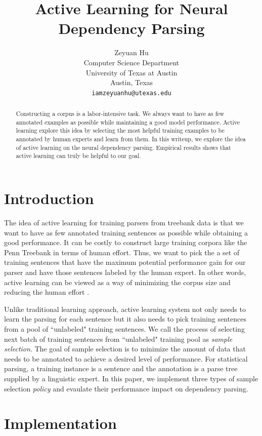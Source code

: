\documentclass[11pt,letterpaper]{article}
\title{Active Learning for Neural Dependency Parsing}
\author{Zeyuan Hu \\
  Computer Science Department \\
  University of Texas at Austin \\
  Austin, Texas \\
  {\tt iamzeyuanhu@utexas.edu} \\
}
\date{}
\begin{document}
\maketitle

\begin{abstract}
	Constructing a corpus is a labor-intensive task. We always want to have as few annotated
	examples as possible while maintaining a good model performance. Active learning explore
	this idea by selecting the most helpful training examples to be annotated by human experts and
	learn from them. In this writeup, we explore the idea of active learning on the neural dependency
	parsing. Empirical results shows that active learning can truly be helpful to our goal.
\end{abstract}

\section{Introduction}

The idea of active learning for training parsers from treebank data is that we want 
to have as few annotated training sentences as possible while obtaining a good performance.
It can be costly to construct large training corpora like the Penn Treebank \cite{Marcus:1994} in terms of
human effort. Thus, we want to pick the a set of training sentences that have the maximum potential performance gain 
for our parser and have those sentences labeled by the human expert. In other words,
active learning can be viewed as a way of minimizing the corpus size and reducing the human effort \cite{Hwa:2000:SSS:1117794.1117800}.

Unlike traditional learning approach, active learning system not only needs to learn the parsing for each sentence but
it also needs to pick training sentences from a pool of ``unlabeled" training sentences. We call the process of
selecting next batch of training sentences from ``unlabeled" training pool as \emph{sample selection}. The goal of
sample selection is to minimize the amount of data that needs to be annotated to achieve a desired level of performance. 
For statistical parsing, a training instance is a sentence and the annotation is a parse tree supplied by a linguistic expert. 
In this paper, we implement three types of sample selection \emph{policy} and evaulate their performance impact on dependency parsing.

\section{Implementation}
\end{document}
